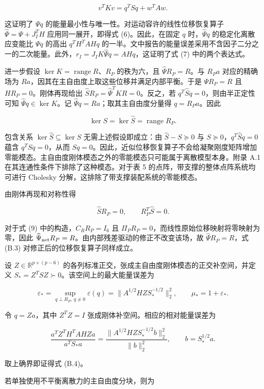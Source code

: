 \documentclass[preprint,12pt,authoryear]{elsarticle}
\begin{document}
\[
v^TKv=q^TSq+w^TAw.
\tag{B.1}
\]

这证明了 \(\Psi q\) 的能量最小性与唯一性。对运动容许的线性位移恢复算子 \(\widehat\Psi=\Psi+J_I^TH\) 应用同一展开，即得式 (6)。因此，在固定 \(q\) 时，\(\widehat\Psi q\) 的稳定化离散应变能比 \(\Psi q\) 的高出 \(q^TH^TAHq\) 的一半。文中报告的能量误差采用不含因子二分之一的二次能量。此外，\(r_I=J_IK\widehat\Psi q=AHq\)，这证明了式 (7) 中的两个表达式。

进一步假设 \(\ker K=\operatorname{range}R\)、\(R_P\) 的秩为六，且 \(\widehat\Psi R_P=R\)。与 \(R_Pa\) 对应的精确场为 \(Ra\)，因其在主自由度上取这些位移并满足内部平衡。于是 \(\Psi R_P=R\) 且 \(HR_P=0\)。刚体再现给出 \(\widehat S R_P=\widehat\Psi^TKR=0\)。反之，若 \(q^T\widehat S q=0\)，则由半正定性可知 \(\widehat\Psi q\in\ker K\)。记 \(\widehat\Psi q=Ra\)；取其主自由度分量得 \(q=R_Pa\)。因此

\[
\ker S=\ker\widehat S=\operatorname{range}R_P.
\tag{B.2}
\]

包含关系 \(\ker\widehat S\subseteq\ker S\) 无需上述假设即成立：由 \(\widehat S-S\succeq0\) 与 \(S\succeq0\)，\(q^T\widehat Sq=0\) 蕴含 \(q^TSq=0\)，从而 \(Sq=0\)。因此，近似位移恢复算子不会给凝聚刚度矩阵增加零能模态。主自由度刚体模态之外的零能模态只可能属于离散模型本身。附录 A.1 在其连通性条件下排除了这种模态。对于表 5 的点阵，带支撑的整体点阵系统均可进行 Cholesky 分解，这排除了带支撑装配系统的零能模态。

由刚体再现和对称性得

\[
\widehat S R_P=0,\qquad R_P^T\widehat S=0.
\tag{B.3}
\]

对于式 (9) 中的构造，\(C_RR_P=I_6\) 且 \(\Pi_PR_P=0\)，而线性原始位移映射将零映射为零，因此 \(\widehat\Psi_{\rm net}R_P=R\)。由内部残差驱动的修正不改变该场，故 \(\widehat\Psi R_P=R\)，式 (B.3) 对修正后的位移恢复算子同样成立。

设 \(Z\in\mathbb R^{p\times(p-6)}\) 的各列标准正交，张成主自由度刚体模态的正交补空间，并定义 \(S_*=Z^TSZ\succ0\)。该空间上的最大能量误差为

\[
\varepsilon_*=\sup_{q\perp R_P,\ q\ne0}\varepsilon(q)
=\|A^{1/2}HZ S_*^{-1/2}\|_2^2,
\qquad\mu_*=1+\varepsilon_*.
\tag{B.4}
\]

令 \(q=Za\)，其中 \(Z^TZ=I\) 张成刚体补空间。相应的相对能量误差为

\[
\frac{a^TZ^TH^TAHZa}{a^TS_*a}
=\frac{\|A^{1/2}HZ S_*^{-1/2}b\|_2^2}{\|b\|_2^2},
\qquad b=S_*^{1/2}a.
\tag{B.5}
\]

取上确界即证得式 (B.4)。

若单独使用不平衡离散力的主自由度分块，则为
\end{document}
